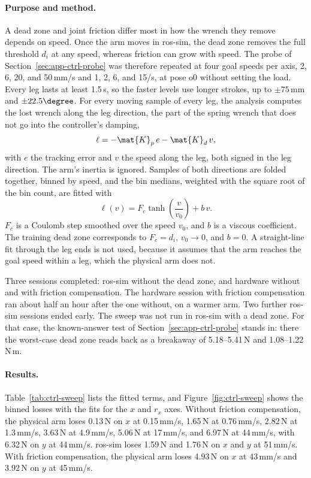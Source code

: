 \paragraph{Purpose and method.} A dead zone and joint friction differ most in how the wrench they remove depends on speed. Once the arm moves in ros-sim, the dead zone removes the full threshold $d_i$ at any speed, whereas friction can grow with speed. The probe of Section~\ref{sec:app-ctrl-probe} was therefore repeated at four goal speeds per axis, 2, 6, 20, and 50\,mm/s and 1, 2, 6, and 15\degree/s, at pose o0 without setting the load. Every leg lasts at least 1.5\,s, so the faster levels use longer strokes, up to $\pm75$\,mm and $\pm22.5\degree$. For every moving sample of every leg, the analysis computes the lost wrench along the leg direction, the part of the spring wrench that does not go into the controller's damping,
\begin{equation}\label{eq:lost-wrench}
  \ell=-\mat{K}_p\,e-\mat{K}_d\,v,
\end{equation}
with $e$ the tracking error and $v$ the speed along the leg, both signed in the leg direction. The arm's inertia is ignored. Samples of both directions are folded together, binned by speed, and the bin medians, weighted with the square root of the bin count, are fitted with
\begin{equation}\label{eq:loss-curve}
  \ell(v)=F_c\tanh\!\left(\frac{v}{v_0}\right)+b\,v.
\end{equation}
$F_c$ is a Coulomb step smoothed over the speed $v_0$, and $b$ is a viscous coefficient. The training dead zone corresponds to $F_c=d_i$, $v_0\to0$, and $b=0$. A straight-line fit through the leg ends is not used, because it assumes that the arm reaches the goal speed within a leg, which the physical arm does not.

Three sessions completed: ros-sim without the dead zone, and hardware without and with friction compensation. The hardware session with friction compensation ran about half an hour after the one without, on a warmer arm. Two further ros-sim sessions ended early. The sweep was not run in ros-sim with a dead zone. For that case, the known-answer test of Section~\ref{sec:app-ctrl-probe} stands in: there the worst-case dead zone reads back as a breakaway of 5.18--5.41\,N and 1.08--1.22\,N\,m.

\paragraph{Results.} Table~\ref{tab:ctrl-sweep} lists the fitted terms, and Figure~\ref{fig:ctrl-sweep} shows the binned losses with the fits for the $x$ and $r_x$ axes. Without friction compensation, the physical arm loses 0.13\,N on $x$ at 0.15\,mm/s, 1.65\,N at 0.76\,mm/s, 2.82\,N at 1.3\,mm/s, 3.63\,N at 4.9\,mm/s, 5.06\,N at 17\,mm/s, and 6.97\,N at 44\,mm/s, with 6.32\,N on $y$ at 44\,mm/s. ros-sim loses 1.59\,N and 1.76\,N on $x$ and $y$ at 51\,mm/s. With friction compensation, the physical arm loses 4.93\,N on $x$ at 43\,mm/s and 3.92\,N on $y$ at 45\,mm/s.

